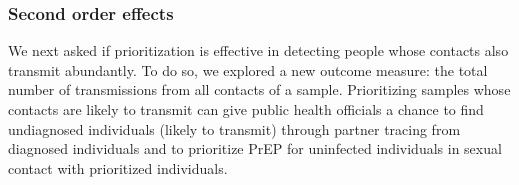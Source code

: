 \documentclass[a4paper,11pt]{article}
\newcommand{\PLWH}{sample\xspace}
\begin{document}
\subsubsection{Second order effects}
We next asked if prioritization is effective in detecting people whose contacts also transmit abundantly. 
To do so, we explored a new outcome measure: the total number of transmissions from all contacts of a \PLWH. 
Prioritizing \PLWH{s} whose contacts are likely to transmit can give public health officials a chance to find undiagnosed individuals (likely to transmit) through partner tracing from diagnosed individuals and to  prioritize PrEP for uninfected individuals in sexual contact with prioritized individuals. 




\end{document}
